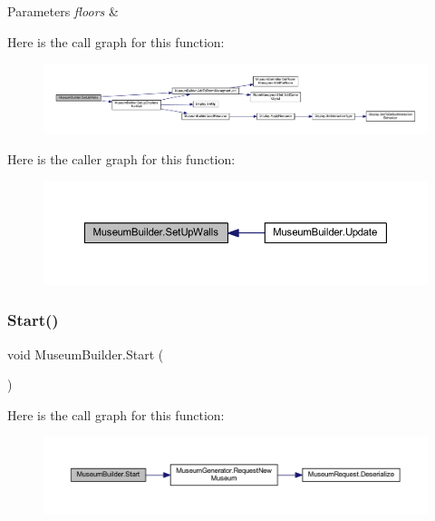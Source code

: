 \begin{DoxyParams}{Parameters}
{\em floors} & \\
\hline
\end{DoxyParams}
Here is the call graph for this function\+:
\nopagebreak
\begin{figure}[H]
\begin{center}
\leavevmode
\includegraphics[width=350pt]{class_museum_builder_a52350d2e48a73d0e5400e2d8d31a8913_cgraph}
\end{center}
\end{figure}
Here is the caller graph for this function\+:
\nopagebreak
\begin{figure}[H]
\begin{center}
\leavevmode
\includegraphics[width=350pt]{class_museum_builder_a52350d2e48a73d0e5400e2d8d31a8913_icgraph}
\end{center}
\end{figure}
\mbox{\label{class_museum_builder_a33c69af71baa8a6033be9d2fc04ef5f8}} 
\subsubsection{\texorpdfstring{Start()}{Start()}}
{\footnotesize\ttfamily void Museum\+Builder.\+Start (\begin{DoxyParamCaption}{ }\end{DoxyParamCaption})\hspace{0.3cm}{\ttfamily [private]}}

Here is the call graph for this function\+:
\nopagebreak
\begin{figure}[H]
\begin{center}
\leavevmode
\includegraphics[width=350pt]{class_museum_builder_a33c69af71baa8a6033be9d2fc04ef5f8_cgraph}
\end{center}
\end{figure}
\mbox{\label{class_museum_builder_a6f66f859260dac43de5248e3c4a0b25c}} 
